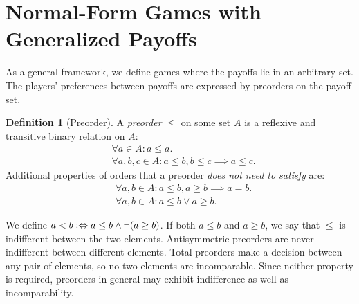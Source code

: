 \documentclass[a4paper]{scrreprt}
\theoremstyle{definition}
\newtheorem{defn}[thm]{Definition} %
\begin{document}
    \section{Normal-Form Games with Generalized Payoffs}
    \label{sec:generalizedPayoffGames}    
    As a general framework, we define games where the payoffs lie in an arbitrary set. The players' preferences between payoffs are expressed by preorders on the payoff set.
    \begin{defn}[Preorder]
        A \emph{preorder} $\leq$ on some set $A$ is a reflexive and transitive binary relation on $A$:
        \begin{align*}
            &\forall a \in A: a \leq a. \tag{Reflexivity} \\
            &\forall a, b, c \in A: a \leq b, b \leq c \implies a \leq c. \tag{Transitivity}
        \end{align*}
        Additional properties of orders that a preorder \emph{does not need to satisfy} are:
        \begin{align*}
            &\forall a, b \in A: a \leq b, a \geq b \implies a = b. \tag{Antisymmetry} \\
            &\forall a, b \in A: a \leq b \vee a \geq b. \tag{Totality}
        \end{align*}
    \end{defn}
    We define $a < b \mathrel{\vcentcolon\Leftrightarrow} a \leq b \wedge \neg( a \geq b)$. If both $a \leq b$ and $a \geq b$, we say that $\leq$ is indifferent between the two elements.
    Antisymmetric preorders are never indifferent between different elements. Total preorders make a decision between any pair of elements, so no two elements are incomparable. Since neither property is required, preorders in general may exhibit indifference as well as incomparability.
    
    
    \let\popref\geq
    \let\pononpref\leq
    \let\postrpref>
    \let\postrnonpref<    
\end{document}
